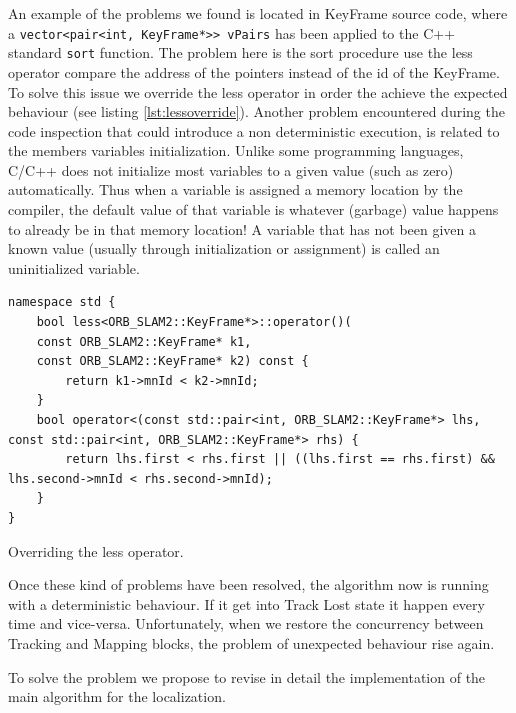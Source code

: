 An example of the problems we found is located in KeyFrame source code, where a \texttt{vector<pair<int, KeyFrame*>> vPairs} has been applied to the C++ standard \texttt{sort} function. The problem here is the sort procedure use the less operator compare the address of the pointers instead of the id of the KeyFrame.
To solve this issue we override the less operator in order the achieve the expected behaviour (see listing \ref{lst:lessoverride}).
Another problem encountered during the code inspection that could introduce a non deterministic execution, is related to the members variables initialization.
Unlike some programming languages, C/C++ does not initialize most variables to a given value (such as zero) automatically. Thus when a variable is assigned a memory location by the compiler, the default value of that variable is whatever (garbage) value happens to already be in that memory location! A variable that has not been given a known value (usually through initialization or assignment) is called an uninitialized variable.

\begin{listing}[H]
\begin{verbatim}
namespace std {
    bool less<ORB_SLAM2::KeyFrame*>::operator()(
    const ORB_SLAM2::KeyFrame* k1,
    const ORB_SLAM2::KeyFrame* k2) const {
        return k1->mnId < k2->mnId;
    }
    bool operator<(const std::pair<int, ORB_SLAM2::KeyFrame*> lhs, const std::pair<int, ORB_SLAM2::KeyFrame*> rhs) {
        return lhs.first < rhs.first || ((lhs.first == rhs.first) && lhs.second->mnId < rhs.second->mnId);
    }
}
\end{verbatim} 
\caption{Overriding the less operator.}
\label{lst:lessoverride}
\end{listing}

Once these kind of problems have been resolved, the algorithm now is running with a deterministic behaviour. If it get into Track Lost state it happen every time and vice-versa. Unfortunately, when we restore the concurrency between Tracking and Mapping blocks, the problem of unexpected behaviour rise again.

To solve the problem we propose to revise in detail the implementation of the main algorithm for the localization. 





